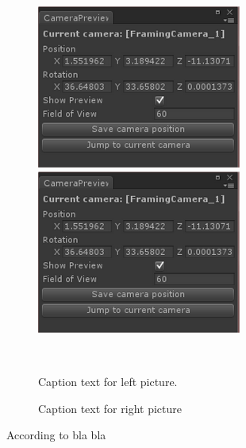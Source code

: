 \begin{figure}[htbp] \centering
\begin{minipage}[b]{0.45\textwidth} \centering
\includegraphics[width=0.60\textwidth]{Pics/Dummy} %
\end{minipage} \hfill
\begin{minipage}[b]{0.45\textwidth} \centering
\includegraphics[width=0.60\textwidth]{Pics/Dummy} %
\end{minipage} \\ %
\begin{minipage}[t]{0.45\textwidth}
\caption{Caption text for left picture.} %
\label{fig:cap1}
\end{minipage} \hfill
\begin{minipage}[t]{0.45\textwidth}
\caption{Caption text for right picture} %
\label{fig:cap2}
\end{minipage}
\end{figure}

According to bla bla \cite{haigh-hutchinson_real-time_2009} %


